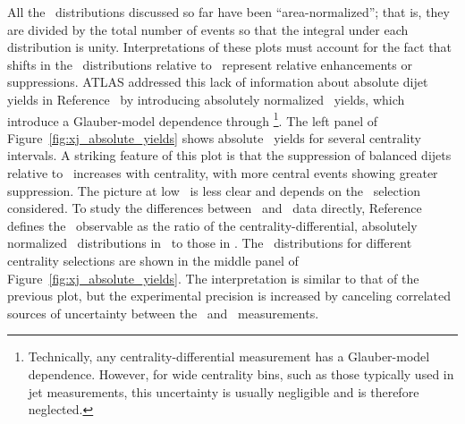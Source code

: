 All the \XJ\ distributions discussed so far have been ``area-normalized''; that is, they are divided by the total number of events so that the integral under each distribution is unity.
Interpretations of these plots must account for the fact that shifts in the \PbxPb\ distributions relative to \pxp\ represent relative enhancements or suppressions.
ATLAS addressed this lack of information about absolute dijet yields in Reference~\cite{HION-2018-28} by introducing absolutely normalized \XJ\ yields, which introduce a Glauber-model dependence through \TAA\footnote{Technically, any centrality-differential measurement has a Glauber-model dependence. However, for wide centrality bins, such as those typically used in jet measurements, this uncertainty is usually negligible and is therefore neglected.}.
The left panel of Figure~\ref{fig:xj_absolute_yields} shows absolute \XJ\ yields for several centrality intervals.
A striking feature of this plot is that the suppression of balanced dijets relative to \pxp\ increases with centrality, with more central events showing greater suppression.
The picture at low \XJ\ is less clear and depends on the \PTONE\ selection considered.
To study the differences between \PbxPb\ and \pxp\ data directly, Reference~\cite{HION-2024-03} defines the \Jaa\ observable as the ratio of the centrality-differential, absolutely normalized \XJ\ distributions in \PbxPb\ to those in \pxp.
The \Jaa\ distributions for different centrality selections are shown in the middle panel of Figure~\ref{fig:xj_absolute_yields}.
The interpretation is similar to that of the previous plot, but the experimental precision is increased by canceling correlated sources of uncertainty between the \PbxPb\ and \pxp\ measurements.

